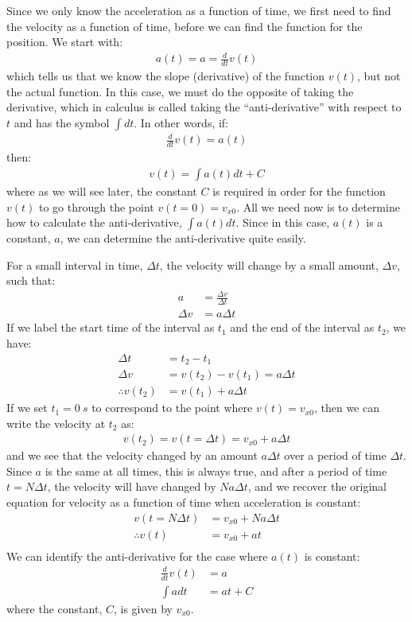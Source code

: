 Since we only know the acceleration as a function of time, we first need to find the velocity as a function of time, before we can find the function for the position. We start with:
\begin{align*}
a(t)=a=\frac{d}{dt} v(t)
\end{align*}
which tells us that we know the slope (derivative) of the function $v(t)$, but not the actual function. In this case, we must do the opposite of taking the derivative, which in calculus is called taking the ``anti-derivative'' with respect to $t$ and has the symbol $\int dt$. In other words, if:
\begin{align*}
\frac{d}{dt} v(t) =a(t)
\end{align*}
then:
\begin{align*}
v(t) =\int a(t) dt +C
\end{align*}
where as we will see later, the constant $C$ is required in order for the function $v(t)$ to go through the point $v(t=0)=v_{x0}$. All we need now is to determine how to calculate the anti-derivative, $\int a(t) dt$. Since in this case, $a(t)$ is a constant, $a$, we can determine the anti-derivative quite easily. 

For a small interval in time, $\Delta t$, the velocity will change by a small amount, $\Delta v$, such that:
\begin{align*}
a &= \frac{\Delta v}{\Delta t}\\
\Delta v &= a \Delta t
\end{align*}
If we label the start time of the interval as $t_1$ and the end of the interval as $t_2$, we have:
\begin{align*}
\Delta t &= t_2 - t_1 \\
\Delta v &= v(t_2) - v(t_1) = a \Delta t\\
\therefore v(t_2) &= v(t_1)+a\Delta t
\end{align*}
If we set $t_1=\SI{0}{s}$ to correspond to the point where $v(t)=v_{x0}$, then we can write the velocity at $t_2$ as:
\begin{align*}
v(t_2) = v(t=\Delta t) = v_{x0}+a\Delta t
\end{align*}
and we see that the velocity changed by an amount $a \Delta t$ over a period of time $\Delta t$. Since $a$ is the same at all times, this is always true, and after a period of time $t = N\Delta t$, the velocity will have changed by $N a \Delta t$, and we recover the original equation for velocity as a function of time when acceleration is constant:
\begin{align*}
v(t=N \Delta t) &= v_{x0}+Na\Delta t\\
\therefore v(t) &= v_{x0}+at\\
\end{align*}
We can identify the anti-derivative for the case where $a(t)$ is constant:
\begin{align*}
\frac{d}{dt} v(t) &=a\\
\int a dt &=at +C
\end{align*}
where the constant, $C$, is given by $v_{x0}$.

